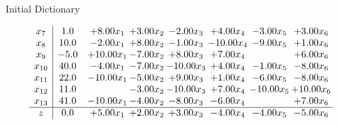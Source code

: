 \documentclass[8pt]{article}
\begin{document}
Initial Dictionary 

\[\begin{array}{c| c c@{\hskip 2pt} c@{\hskip 2pt} c@{\hskip 2pt} c@{\hskip 2pt} c@{\hskip 2pt} c@{\hskip 2pt} }
 x_{7}   &  1.0 & +  8.00 x_{1} & +  3.00 x_{2} & -2.00 x_{3} & +  4.00 x_{4} & -3.00 x_{5} & +  3.00 x_{6}\\
 x_{8}   &  10.0 & -2.00 x_{1} & +  8.00 x_{2} & -1.00 x_{3} & -10.00 x_{4} & -9.00 x_{5} & +  1.00 x_{6}\\
 x_{9}   &  -5.0 & + 10.00 x_{1} & -7.00 x_{2} & +  8.00 x_{3} & +  7.00 x_{4} &   & +  6.00 x_{6}\\
 x_{10}   &  40.0 & -4.00 x_{1} & -7.00 x_{2} & -10.00 x_{3} & +  4.00 x_{4} & -1.00 x_{5} & -8.00 x_{6}\\
 x_{11}   &  22.0 & -10.00 x_{1} & -5.00 x_{2} & +  9.00 x_{3} & +  1.00 x_{4} & -6.00 x_{5} & -8.00 x_{6}\\
 x_{12}   &  11.0  &   & -3.00 x_{2} & -10.00 x_{3} & +  7.00 x_{4} & -10.00 x_{5} & + 10.00 x_{6}\\
 x_{13}   &  41.0 & -10.00 x_{1} & -4.00 x_{2} & -8.00 x_{3} & -6.00 x_{4} &   & +  7.00 x_{6}\\
\hline
z    &  0.0 & +  5.00 x_{1} & +  2.00 x_{2} & +  3.00 x_{3} & -4.00 x_{4} & -4.00 x_{5} & -5.00 x_{6}\\
\end{array}\]
\end{document}
